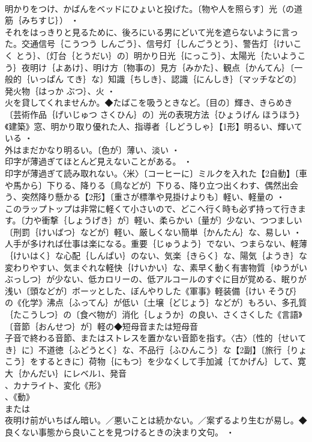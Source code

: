 \documentclass[8pt]{extreport}
\begin{document}
\begin{CJK}{UTF8}{min}
\\	明かりをつけ、かばんをベッドにひょいと投げた。〔物や人を照らす〕光（の道筋｛みちすじ｝） ・
\\	それをはっきりと見るために、後ろにいる男にどいて光を遮らないように言った。交通信号｛こうつう しんごう｝、信号灯｛しんごうとう｝、警告灯｛けいこく とう｝、〔灯台｛とうだい｝の〕明かり日光｛にっこう｝、太陽光｛たいようこう｝夜明け｛よあけ｝、明け方〔物事の〕見方｛みかた｝、観点｛かんてん｝〔一般的｛いっぱん てき｝な〕知識｛ちしき｝、認識｛にんしき｝〔マッチなどの〕発火物｛はっか ぶつ｝、火 ・
\\	火を貸してくれませんか。◆たばこを吸うときなど。〔目の〕輝き、きらめき〔芸術作品｛げいじゅつ さくひん｝の〕光の表現方法｛ひょうげん ほうほう｝《建築》窓、明かり取り優れた人、指導者｛しどうしゃ｝【1形】明るい、輝いている ・
\\	外はまだかなり明るい。〔色が〕薄い、淡い ・
\\	印字が薄過ぎてほとんど見えないことがある。 ・
\\	印字が薄過ぎて読み取れない。〈米〉〔コーヒーに〕ミルクを入れた【2自動】〔車や馬から〕下りる、降りる〔鳥などが〕下りる、降り立つ出くわす、偶然出会う、突然降り懸かる【2形】〔重さが標準や見掛けよりも〕軽い、軽量の ・
\\	このラップトップは非常に軽くて小さいので、どこへ行く時も必ず持って行きます。〔力や衝撃｛しょうげき｝が〕軽い、柔らかい〔量が〕少ない、つつましい〔刑罰｛けいばつ｝などが〕軽い、厳しくない簡単｛かんたん｝な、易しい ・
\\	人手が多ければ仕事は楽になる。重要｛じゅうよう｝でない、つまらない、軽薄｛けいはく｝な心配｛しんぱい｝のない、気楽｛きらく｝な、陽気｛ようき｝な変わりやすい、気まぐれな軽快｛けいかい｝な、素早く動く有害物質｛ゆうがい ぶっしつ｝が少ない、低カロリーの、低アルコールのすぐに目が覚める、眠りが浅い〔頭などが〕ボーッとした、ぼんやりした《軍事》軽装備｛けい そうび｝の《化学》沸点｛ふってん｝が低い〔土壌｛どじょう｝などが〕もろい、多孔質｛たこうしつ｝の〔食べ物が〕消化｛しょうか｝の良い、さくさくした《言語》〔音節｛おんせつ｝が〕軽の◆短母音または短母音
\\	子音で終わる音節、またはストレスを置かない音節を指す。〈古〉〔性的｛せいてき｝に〕不道徳｛ふどうとく｝な、不品行｛ふひんこう｝な【2副】〔旅行｛りょこう｝をするときに〕荷物｛にもつ｝を少なくして手加減｛てかげん｝して、寛大｛かんだい｝にレベル1、発音
\\	、カナライト、変化《形》
\\	、《動》
\\	または
\\	夜明け前がいちばん暗い。／悪いことは続かない。／案ずるより生むが易し。◆良くない事態から良いことを見つけるときの決まり文句。 ・

\end{CJK}
\end{document}

